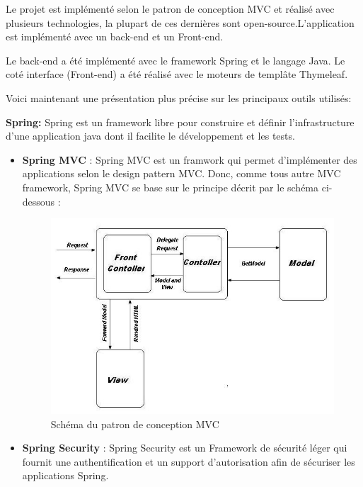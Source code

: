 \documentclass[12pt]{article}
\begin{document}
Le projet est implémenté selon le patron de conception MVC et réalisé avec plusieurs technologies, la plupart de ces dernières sont open-source.L'application est implémenté avec un back-end et un Front-end.

Le back-end a été implémenté avec le framework Spring et le langage Java. Le coté interface (Front-end) a été réalisé avec le moteurs de templâte Thymeleaf. 

Voici maintenant une présentation plus précise sur les principaux outils utilisés:\newline

\textbf{Spring:}  Spring est un framework libre pour construire et définir l'infrastructure d'une application java dont il facilite le développement et les tests.\newline

\begin{itemize}
	\item \textbf{Spring MVC} : Spring MVC est un framwork qui permet d’implémenter des applications selon le design pattern MVC. Donc, comme tous autre MVC framework, Spring MVC se base sur le principe décrit par le schéma ci-dessous :\newline
	

\begin{figure}[H]
	\centering
 		\includegraphics[width=1\textwidth]{diagrammes/mvc.jpg} 
  		\caption{Schéma du patron de conception MVC}
	\end{figure}
	
	\item \textbf{Spring Security }: Spring Security est un Framework de sécurité léger qui fournit une authentification et un support d’autorisation afin de sécuriser les applications Spring.\newline
\end{itemize} 
\end{document}
